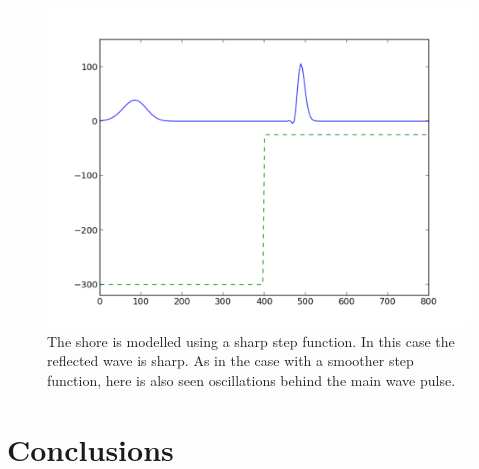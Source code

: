 \documentclass[twoside]{article}
\begin{document}
\begin{figure} 
  \centering
  \includegraphics[scale=0.4]{gustavs_codes/movie_1dwave_box_shore/figure.pdf}
  \caption{The shore is modelled using a sharp step function. In this case the reflected wave is sharp. As in the case with a smoother step function, here is also seen oscillations behind the main wave pulse.}
\end{figure}
 

\section{Conclusions}


\printindex
\end{document}
